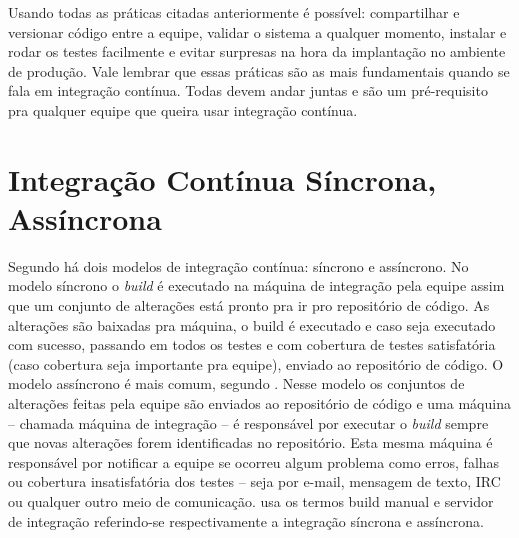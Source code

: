 \documentclass[10pt,a4paper,font=plain]{abnt}
\begin{document}
Usando todas as práticas citadas anteriormente é possível: compartilhar e versionar código entre a equipe, validar o sistema a qualquer momento, instalar e rodar os testes facilmente e evitar surpresas na hora da implantação no ambiente de produção. Vale lembrar que essas práticas são as mais fundamentais quando se fala em integração contínua. Todas devem andar juntas e são um pré-requisito pra qualquer equipe que queira usar integração contínua.



\section{Integração Contínua Síncrona, Assíncrona}

Segundo  há dois modelos de integração contínua: síncrono e assíncrono.
No modelo síncrono o \textit{build} é executado na máquina de integração pela equipe assim que um conjunto de alterações está pronto pra ir pro repositório de código. As alterações são baixadas pra máquina, o build é executado e caso seja executado com sucesso, passando em todos os testes e com cobertura de testes satisfatória (caso cobertura seja importante pra equipe), enviado ao repositório de código.
O modelo assíncrono é mais comum, segundo . Nesse modelo os conjuntos de alterações feitas pela equipe são enviados ao repositório de código e uma máquina -- chamada máquina de integração -- é responsável por executar o \textit{build} sempre que novas alterações forem identificadas no repositório. Esta mesma máquina é responsável por notificar a equipe se ocorreu algum problema como erros, falhas ou cobertura insatisfatória dos testes -- seja por e-mail, mensagem de texto, IRC ou qualquer outro meio de comunicação.  usa os termos build manual e servidor de integração referindo-se respectivamente a integração síncrona e assíncrona.
\end{document}
